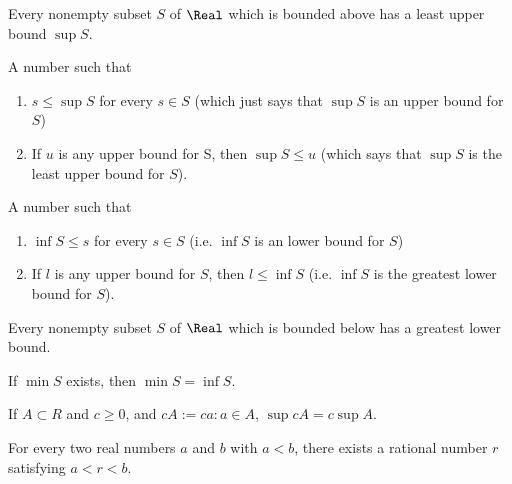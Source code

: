 \begin{theorem}
  Every nonempty subset $S$ of $\Real$ which is bounded above has a least upper bound $\sup S$.
\end{theorem}

\begin{definition}
  A number such that 
  \begin{enumerate}[(1)]
    \item $s \leq \sup S$ for every $s \in S$ (which just says that $\sup S$ is an upper bound for $S$)
    \item If $u$ is any upper bound for S, then $\sup S \leq u$ (which says that $\sup S$ is the least upper bound for $S$).
  \end{enumerate}
\end{definition}

\begin{definition}
  A number such that 
  \begin{enumerate}[(1)]
    \item $\inf S \leq s$ for every $s \in S$ (i.e. $\inf S$ is an lower bound for $S$)
    \item If $l$ is any upper bound for $S$, then $l \leq \inf S$ (i.e. $\inf S$ is the greatest lower bound for $S$).
  \end{enumerate}
\end{definition}

\begin{theorem}
  Every nonempty subset $S$ of $\Real$ which is bounded below has a greatest lower bound.
\end{theorem}

\begin{theorem}
  If $\min S$ exists, then $\min S = \inf S$.
\end{theorem}

\begin{theorem}
  If $A \subset R$ and $c \geq 0$, and $cA := {ca : a \in A}$, $\sup cA = c \sup A$.
\end{theorem}


\begin{theorem}
  For every two real numbers $a$ and $b$ with $a < b$, there exists a rational number $r$ satisfying $a < r < b$.
\end{theorem}

